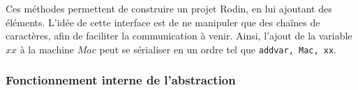 Ces méthodes permettent de construire un projet Rodin, en lui ajoutant des éléments.
L'idée de cette interface est de ne manipuler que des chaînes de caractères, afin de faciliter la communication à venir.
Ainsi, l'ajout de la variable \(xx\) à la machine \(Mac\) peut se sérialiser en un ordre tel que \texttt{addvar, Mac, xx}.


\subsubsection{Fonctionnement interne de l'abstraction}
